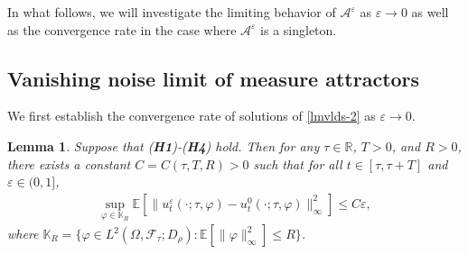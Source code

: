 \documentclass[11pt]{article}
\numberwithin{equation}{section}
\theoremstyle{plain}
\newtheorem{lemma}{Lemma}[section]
\begin{document}
 In what follows,
 we will investigate the limiting behavior of $\mathcal{A}^\varepsilon$ as   $\varepsilon
 \to 0$   as well as the convergence rate
 in the case 
 where  $\mathcal{A}^\varepsilon$
 is a singleton.
 
 
\subsection{Vanishing noise limit of measure attractors}

 We first establish the convergence rate of solutions of \eqref{lmvlds-2} as $\varepsilon \to 0$.
 
 \begin{lemma}\label{solcon}
   Suppose that ({\bf H1})-({\bf H4}) hold.
   Then for any $\tau \in \mathbb{R}$, $T > 0$, and $R > 0$,
   there exists a constant $C = C(\tau, T, R) > 0$ such that 
   for all $t \in [\tau, \tau+T]$ and $\varepsilon \in (0,1]$,
   \begin{align*}
      \sup_{\varphi \in \mathbb{K}_R}
         \mathbb{E} 
                \left[ \| u^\varepsilon_{t}(\cdot; \tau, \varphi) 
                             - u^0_{t}(\cdot; \tau, \varphi) \|_{\infty}^2 
                \right]
      \le C \varepsilon,
   \end{align*}
   where
        $\mathbb{K}_R
          = \{ \varphi \in L^{2}(\Omega, \mathcal{F}_{\tau}; D_{\rho}) :
                  \mathbb{E} \left[ \|\varphi\|^{2}_{\infty} \right] \le R
            \}$.
 \end{lemma}
 
\end{document}
